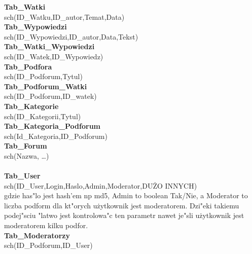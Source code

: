 \documentclass[12pt,a4paper,twoside]{article}
\begin{document}
\textbf{Tab\_{}Watki}\\
sch(ID\_{}Watku,ID\_{}autor,Temat,Data)\\
\textbf{Tab\_{}Wypowiedzi}\\
sch(ID\_{}Wypowiedzi,ID\_{}autor,Data,Tekst)\\
\textbf{Tab\_{}Watki\_{}Wypowiedzi}\\
sch(ID\_{}Watek,ID\_{}Wypowiedz)\\
\textbf{Tab\_{}Podfora}\\
sch(ID\_{}Podforum,Tytul)\\
\textbf{Tab\_{}Podforum\_{}Watki}\\
sch(ID\_{}Podforum,ID\_{}watek)\\
\textbf{Tab\_{}Kategorie}\\
sch(ID\_{}Kategorii,Tytul)\\
\textbf{Tab\_{}Kategoria\_{}Podforum}\\
sch(Id\_{}Kategoria,ID\_{}Podforum)\\
\textbf{Tab\_{}Forum}\\
sch(Nazwa, \ldots)\\
\\
\textbf{Tab\_{}User}\\
sch(ID\_{}User,Login,Haslo,Admin,Moderator,DU\.ZO INNYCH)\\
gdzie has"lo jest hash'em np md5, Admin to boolean Tak/Nie, a Moderator to liczba podform dla kt"orych u\.zytkownik jest moderatorem. Dzi"eki takiemu podej"sciu "latwo jest kontrolowa"c ten parametr nawet je"sli u\.zytkownik jest moderatorem kilku podfor.\\
\textbf{Tab\_{}Moderatorzy}\\
sch(ID\_{}Podforum,ID\_{}User)\\
\end{document}
